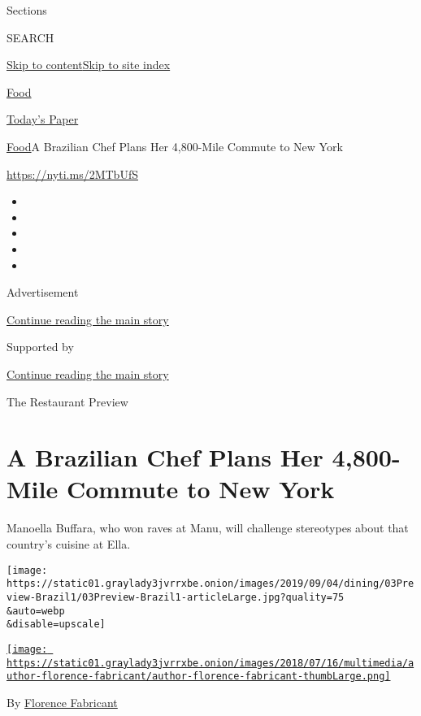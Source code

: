 Sections

SEARCH

\protect\hyperlink{site-content}{Skip to
content}\protect\hyperlink{site-index}{Skip to site index}

\href{https://www.nytimes3xbfgragh.onion/section/food}{Food}

\href{https://myaccount.nytimes3xbfgragh.onion/auth/login?response_type=cookie\&client_id=vi}{}

\href{https://www.nytimes3xbfgragh.onion/section/todayspaper}{Today's
Paper}

\href{/section/food}{Food}\textbar{}A Brazilian Chef Plans Her
4,800-Mile Commute to New York

\url{https://nyti.ms/2MTbUfS}

\begin{itemize}
\item
\item
\item
\item
\item
\end{itemize}

Advertisement

\protect\hyperlink{after-top}{Continue reading the main story}

Supported by

\protect\hyperlink{after-sponsor}{Continue reading the main story}

The Restaurant Preview

\hypertarget{a-brazilian-chef-plans-her-4800-mile-commute-to-new-york}{%
\section{A Brazilian Chef Plans Her 4,800-Mile Commute to New
York}\label{a-brazilian-chef-plans-her-4800-mile-commute-to-new-york}}

Manoella Buffara, who won raves at Manu, will challenge stereotypes
about that country's cuisine at Ella.

\texttt{[image: https://static01.graylady3jvrrxbe.onion/images/2019/09/04/dining/03Preview-Brazil1/03Preview-Brazil1-articleLarge.jpg?quality=75\\\&auto=webp\\\&disable=upscale]}

\href{https://www.nytimes3xbfgragh.onion/by/florence-fabricant}{\texttt{[image: https://static01.graylady3jvrrxbe.onion/images/2018/07/16/multimedia/author-florence-fabricant/author-florence-fabricant-thumbLarge.png]}}

By
\href{https://www.nytimes3xbfgragh.onion/by/florence-fabricant}{Florence
Fabricant}

